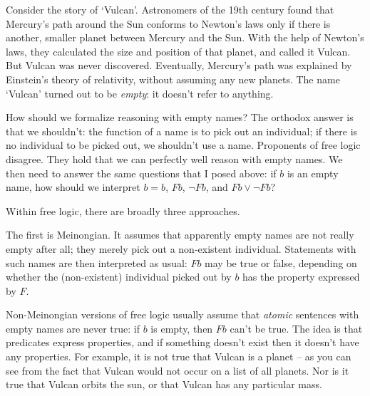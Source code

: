 Consider the story of `Vulcan'. Astronomers of the 19th century found that
Mercury's path around the Sun conforms to Newton's laws only if there is
another, smaller planet between Mercury and the Sun. With the help of Newton's
laws, they calculated the size and position of that planet, and called it
Vulcan. But Vulcan was never discovered. Eventually, Mercury's path was
explained by Einstein's theory of relativity, without assuming any new planets.
The name `Vulcan' turned out to be \emph{empty}: it doesn't refer to anything.


How should we formalize reasoning with empty names? The orthodox answer is that
we shouldn't: the function of a name is to pick out an individual; if there is
no individual to be picked out, we shouldn't use a name. Proponents of free
logic disagree. They hold that we can perfectly well reason with empty names. We
then need to answer the same questions that I posed above: if $b$ is an empty
name, how should we interpret $b=b$, $Fb$, $\neg Fb$, and $Fb \lor \neg Fb$?

Within free logic, there are broadly three approaches.

The first is Meinongian. It assumes that apparently empty names are not really
empty after all; they merely pick out a non-existent individual. Statements with
such names are then interpreted as usual: $Fb$ may be true or false, depending
on whether the (non-existent) individual picked out by $b$ has the property
expressed by $F$.

Non-Meinongian versions of free logic usually assume that \emph{atomic}
sentences with empty names are never true: if $b$ is empty, then $Fb$ can't be
true. The idea is that predicates express properties, and if something doesn't
exist then it doesn't have any properties. For example, it is not true that
Vulcan is a planet -- as you can see from the fact that Vulcan would not occur
on a list of all planets. Nor is it true that Vulcan orbits the sun, or that
Vulcan has any particular mass.


